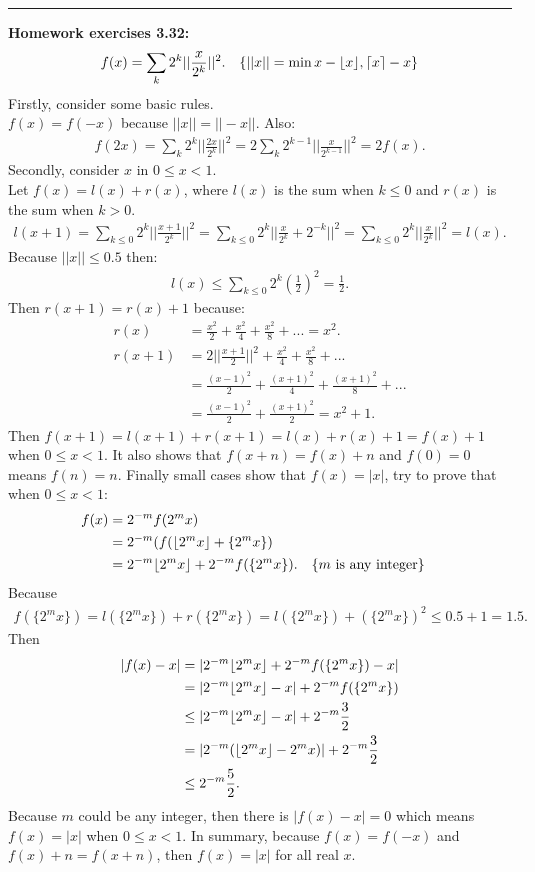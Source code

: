 \documentclass{article}
\DeclarePairedDelimiter\ceil{\lceil}{\rceil}
\DeclarePairedDelimiter\floor{\lfloor}{\rfloor}
\begin{document}
\noindent\rule{\textwidth}{0.4pt}
\textbf{Homework exercises 3.32:}
\begin{align}
f(x) = \sum_k 2^k ||\frac{x}{2^k}||^2. && \{||x|| = \min{x - \floor{x},\ceil{x}-x}\}
\end{align}
Firstly, consider some basic rules.\\
$f(x) = f(-x)$ because $||x|| = ||-x||$.
Also:
\begin{align}
f(2x) = \sum_k 2^k ||\frac{2x}{2^k}||^2 = 2\sum_k 2^{k-1} ||\frac{x}{2^{k-1}}||^2 = 2f(x).
\end{align}
Secondly, consider $x$ in $0 \le x < 1$.\\
Let $f(x) = l(x) + r(x)$, where $l(x)$ is the sum when $k\le0$ and $r(x)$ is the sum when $k > 0$.
\begin{align}
l(x+1) = \sum_{k \le 0} 2^k ||\frac{x+1}{2^k}||^2 = \sum_{k \le 0} 2^k ||\frac{x}{2^k} + 2^{-k}||^2 = \sum_{k \le 0} 2^k ||\frac{x}{2^k}||^2 = l(x).
\end{align}
Because $||x|| \le 0.5$ then:
\begin{align}
l(x) \le \sum_{k \le 0} 2^k (\frac{1}{2})^2 = \frac{1}{2}.
\end{align}
Then $r(x+1) = r(x) + 1$ because:
\begin{align}
r(x) &= \frac{x^2}{2} + \frac{x^2}{4} + \frac{x^2}{8} + ... = x^2. \\
r(x+1) &= 2||\frac{x+1}{2}||^2 + \frac{x^2}{4} + \frac{x^2}{8} + ... \\
       &= \frac{(x-1)^2}{2} + \frac{(x+1)^2}{4} + \frac{(x+1)^2}{8} + ... \\
       &= \frac{(x-1)^2}{2} + \frac{(x+1)^2}{2} = x^2 + 1.
\end{align}
Then $f(x+1) = l(x+1) + r(x+1) = l(x) + r(x)+1 = f(x)+ 1$ when $0\le x < 1$.
It also shows that $f(x+n) = f(x) + n$ and $f(0) = 0$ means $f(n) = n$.
Finally small cases show that $f(x) = |x|$, try to prove that when $0 \le x < 1$:
\begin{align}
f(x) &= 2^{-m}f(2^mx) \\
     &= 2^{-m} (f(\floor{2^mx} + \{2^mx\}) \\
     &= 2^{-m}\floor{2^mx} + 2^{-m}f(\{2^mx\}). &&\{m \text{ is any integer}\}
\end{align}
Because 
\begin{align}
f(\{2^mx\}) = l(\{2^mx\}) + r(\{2^mx\}) = l(\{2^mx\}) + (\{2^mx\})^2 \le 0.5 + 1 = 1.5.
\end{align}
Then 
\begin{align}
|f(x) - x| &= |2^{-m}\floor{2^mx} + 2^{-m}f(\{2^mx\}) - x| \\
	   &= |2^{-m}\floor{2^mx} - x| + 2^{-m}f(\{2^mx\})  \\
	   &\le |2^{-m}\floor{2^mx} - x| + 2^{-m}\frac{3}{2}  \\
	   &= |2^{-m}(\floor{2^mx} - 2^mx)| + 2^{-m}\frac{3}{2}  \\
	   &\le 2^{-m} \frac{5}{2}.
\end{align}
Because $m$ could be any integer, then there is $|f(x) - x| = 0$ which means $f(x) = |x|$ when $0\le x < 1$.
In summary, because $f(x) = f(-x)$ and $f(x) +n = f(x+n)$, then $f(x) = |x|$ for all real $x$. 
\end{document}
